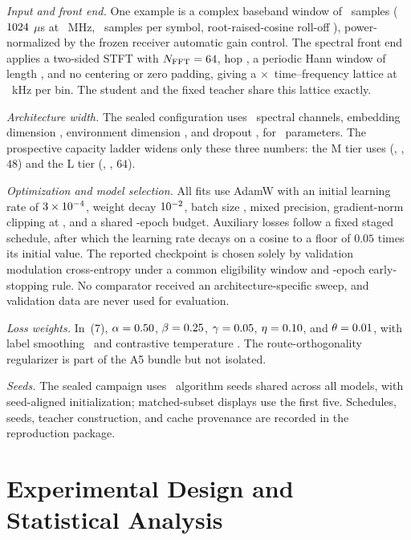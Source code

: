 \documentclass[letterpaper,journal]{IEEEtran}
\begin{document}
\emph{Input and front end.} One example is a complex baseband window of
\WindowSamples\ samples ($1024$ $\mu$s at \SampleRateMHz\ MHz,
\SamplesPerSymbol\ samples per symbol, root-raised-cosine roll-off
\RrcRolloff), power-normalized by the frozen receiver automatic gain control. The spectral
front end
applies a two-sided STFT with $N_{\mathrm{FFT}}=64$, hop \HopLength, a
periodic Hann window of length \NFft, and no centering or zero padding, giving
a \StftBins$\times$\StftFrames\ time--frequency lattice at \StftBinHz\ kHz per
bin. The student and the fixed teacher share this lattice exactly.

\emph{Architecture width.} The sealed configuration uses \SpectralChannels\
spectral channels, embedding dimension \EmbeddingDim, environment dimension
\EnvironmentDim, and dropout \DropoutRate, for \ParamsAFive\ parameters. The
prospective capacity ladder widens only these three numbers: the M tier uses
(\CapacityMSpectral, \CapacityMEmbedding, $48$) and the L tier
(\CapacityLSpectral, \CapacityLEmbedding, $64$).

\emph{Optimization and model selection.} All fits use AdamW with an initial
learning rate of $3\times10^{-4}$, weight decay $10^{-2}$, batch size
\TrainBatch, mixed precision, gradient-norm clipping at \GradClip, and a shared
\TrainEpochs-epoch budget. Auxiliary losses follow a fixed staged schedule,
after which the learning rate decays on a cosine to a floor of $0.05$ times
its initial value. The reported checkpoint is chosen solely by validation
modulation cross-entropy under a common eligibility window and
\TrainPatience-epoch early-stopping rule. No comparator received an
architecture-specific sweep, and validation data are never used for
evaluation.

\emph{Loss weights.} In~(7), $\alpha=0.50$, $\beta=0.25$,
$\gamma=0.05$, $\eta=0.10$, and $\theta=0.01$, with label
smoothing \LabelSmoothing\ and contrastive temperature \ContrastTemp. The
route-orthogonality regularizer is part of the A5 bundle but not isolated.

\emph{Seeds.} The sealed campaign uses \ProtocolSeedCount\ algorithm seeds
shared across all models, with seed-aligned initialization; matched-subset
displays use the first five. Schedules, seeds, teacher construction, and
cache provenance are recorded in the reproduction package.

\section{Experimental Design and Statistical Analysis}
\end{document}
